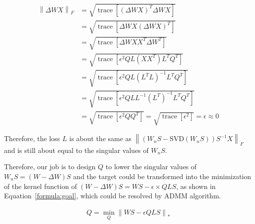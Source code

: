 \vspace{-2mm}
{\small 
\begin{equation}
\begin{split}
     \left\|\Delta WX\right\|_F 
     &= \sqrt{\operatorname{trace}[(\Delta WX)^T \Delta WX]}\\
     &= \sqrt{\operatorname{trace}[\Delta WX(\Delta WX)^T ]}\\
     &= \sqrt{\operatorname{trace}[\Delta W XX^T \Delta W ^T]} \\
     &= \sqrt{\operatorname{trace}[\epsilon^2 QL(XX^T)L^TQ^T]} \\
     &= \sqrt{\operatorname{trace}[\epsilon^2 QL(L^TL)^{-1}L^TQ^T]} \\
     &= \sqrt{\operatorname{trace}[\epsilon^2 QLL^{-1}(L^T)^{-1}L^TQ^T]} \\
     &= \sqrt{\operatorname{trace}[\epsilon^2 QQ^T]} = \sqrt{\operatorname{trace}[\epsilon^2]} = \epsilon \approx 0 
\end{split}
\label{formula:d2}
\end{equation}
}

Therefore, the loss $L$ is about the same as {\small$\left\|(W_n S -\text{SVD}(W_n S)) S^{-1} X\right\|_F$} and is still about equal to the singular values of $W_n S$.

Therefore, our job is to design $Q$ to lower the singular values of $W_n S = (W-\Delta W)S$ and the target could be transformed into the minimization of the kernel function of $(W-\Delta W)S = WS - \epsilon \times Q LS$, as shown in Equation~\ref{formula:goal}, which could be resolved by ADMM algorithm.

\vspace{-2mm}
{\small
\begin{equation}
\begin{split}
     Q = \min_{Q} \left\|WS - \epsilon Q L S\right\|_*
\end{split}
\label{formula:goal}
\end{equation}
}
